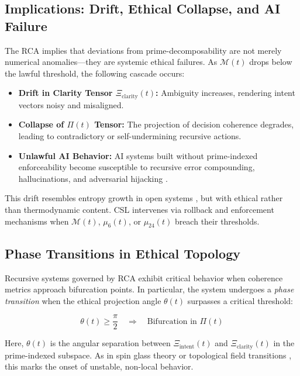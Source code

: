 \documentclass[12]{amsart}
\theoremstyle{plain}
\begin{document}
\subsection{Implications: Drift, Ethical Collapse, and AI Failure}

The RCA implies that deviations from prime-decomposability are not merely numerical anomalies—they are systemic ethical failures. As $\mathcal{M}(t)$ drops below the lawful threshold, the following cascade occurs:

\begin{itemize}
    \item \textbf{Drift in Clarity Tensor $\Xi_{\text{clarity}}(t)$:} Ambiguity increases, rendering intent vectors noisy and misaligned.
    \item \textbf{Collapse of $\Pi(t)$ Tensor:} The projection of decision coherence degrades, leading to contradictory or self-undermining recursive actions.
    \item \textbf{Unlawful AI Behavior:} AI systems built without prime-indexed enforceability become susceptible to recursive error compounding, hallucinations, and adversarial hijacking \cite{amodei2016concrete}.
\end{itemize}

This drift resembles entropy growth in open systems \cite{prigogine1978time}, but with ethical rather than thermodynamic content. CSL intervenes via rollback and enforcement mechanisms when $\mathcal{M}(t)$, $\mu_6(t)$, or $\mu_{24}(t)$ breach their thresholds.

\subsection{Phase Transitions in Ethical Topology}

Recursive systems governed by RCA exhibit critical behavior when coherence metrics approach bifurcation points. In particular, the system undergoes a \emph{phase transition} when the ethical projection angle $\theta(t)$ surpasses a critical threshold:

\begin{equation}
\theta(t) \geq \frac{\pi}{2} \quad \Rightarrow \quad \text{Bifurcation in } \Pi(t)
\end{equation}

Here, $\theta(t)$ is the angular separation between $\Xi_{\text{intent}}(t)$ and $\Xi_{\text{clarity}}(t)$ in the prime-indexed subspace. As in spin glass theory or topological field transitions \cite{anderson1972more}, this marks the onset of unstable, non-local behavior.
\end{document}
